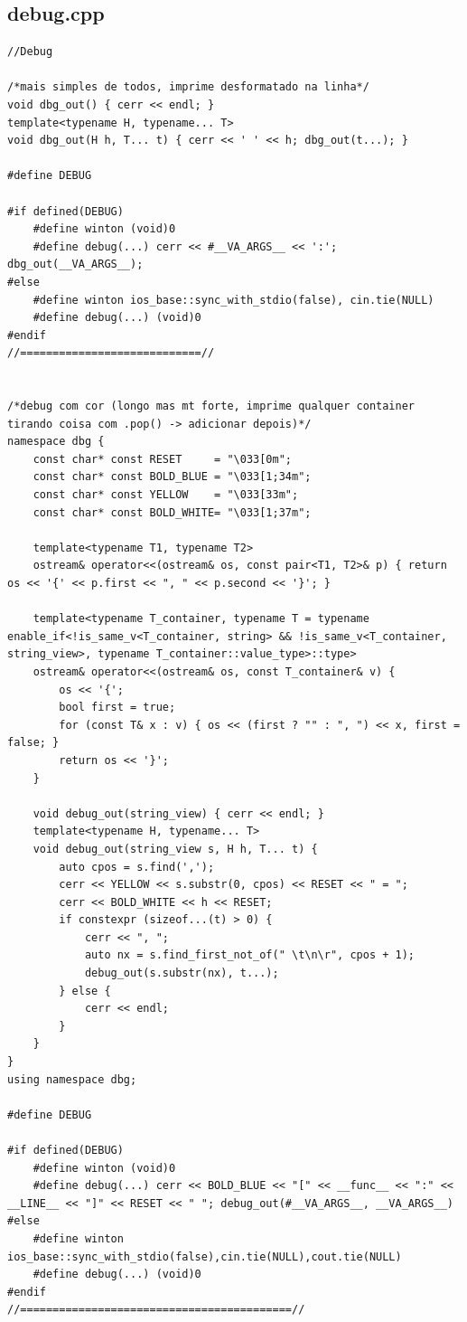 \documentclass[11pt, a4paper, twoside]{article}
\begin{document}
\subsection{debug.cpp}
\begin{lstlisting}
//Debug

/*mais simples de todos, imprime desformatado na linha*/
void dbg_out() { cerr << endl; }
template<typename H, typename... T> 
void dbg_out(H h, T... t) { cerr << ' ' << h; dbg_out(t...); }

#define DEBUG

#if defined(DEBUG)
    #define winton (void)0
    #define debug(...) cerr << #__VA_ARGS__ << ':'; dbg_out(__VA_ARGS__);
#else
    #define winton ios_base::sync_with_stdio(false), cin.tie(NULL)
    #define debug(...) (void)0
#endif
//============================//


/*debug com cor (longo mas mt forte, imprime qualquer container tirando coisa com .pop() -> adicionar depois)*/
namespace dbg {
    const char* const RESET     = "\033[0m";
    const char* const BOLD_BLUE = "\033[1;34m";
    const char* const YELLOW    = "\033[33m";
    const char* const BOLD_WHITE= "\033[1;37m";

    template<typename T1, typename T2>
    ostream& operator<<(ostream& os, const pair<T1, T2>& p) { return os << '{' << p.first << ", " << p.second << '}'; }

    template<typename T_container, typename T = typename enable_if<!is_same_v<T_container, string> && !is_same_v<T_container, string_view>, typename T_container::value_type>::type>
    ostream& operator<<(ostream& os, const T_container& v) {
        os << '{';
        bool first = true;
        for (const T& x : v) { os << (first ? "" : ", ") << x, first = false; }
        return os << '}';
    }

    void debug_out(string_view) { cerr << endl; }
    template<typename H, typename... T>
    void debug_out(string_view s, H h, T... t) {
        auto cpos = s.find(',');
        cerr << YELLOW << s.substr(0, cpos) << RESET << " = ";
        cerr << BOLD_WHITE << h << RESET;
        if constexpr (sizeof...(t) > 0) {
            cerr << ", ";
            auto nx = s.find_first_not_of(" \t\n\r", cpos + 1);
            debug_out(s.substr(nx), t...);
        } else {
            cerr << endl;
        }
    }
} 
using namespace dbg;

#define DEBUG

#if defined(DEBUG)
    #define winton (void)0
    #define debug(...) cerr << BOLD_BLUE << "[" << __func__ << ":" << __LINE__ << "]" << RESET << " "; debug_out(#__VA_ARGS__, __VA_ARGS__)
#else
    #define winton ios_base::sync_with_stdio(false),cin.tie(NULL),cout.tie(NULL)
    #define debug(...) (void)0
#endif
//==========================================//



\end{lstlisting}
\end{document}
